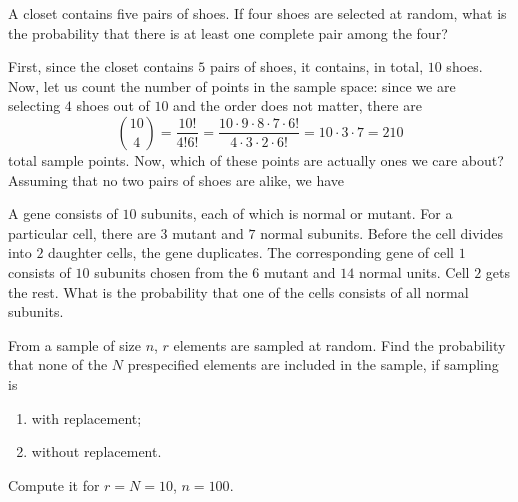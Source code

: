 \begin{problem}
  A closet contains five pairs of shoes. If four shoes are selected at
  random, what is the probability that there is at least one complete pair
  among the four?
\end{problem}
\begin{solution}
  First, since the closet contains \(5\) pairs of shoes, it contains, in
  total, \(10\) shoes. Now, let us count the number of points in the sample
  space: since we are selecting \(4\) shoes out of \(10\) and the order
  does not matter, there are
  \begin{equation}
    \label{eq:1-1}
    \binom{10}{4}=%
    \frac{10!}{4!6!}=%
    \frac{10\cdot 9\cdot 8\cdot 7\cdot 6!}{4\cdot 3\cdot 2\cdot 6!}=%
    10\cdot 3\cdot 7=%
    210
  \end{equation}
  total sample points. Now, which of these points are actually ones we care
  about? Assuming that no two pairs of shoes are alike, we have
\end{solution}
\newpage

\begin{problem}
  A gene consists of \(10\) subunits, each of which is normal or
  mutant. For a particular cell, there are \(3\) mutant and \(7\) normal
  subunits. Before the cell divides into \(2\) daughter cells, the gene
  duplicates. The corresponding gene of cell \(1\) consists of \(10\)
  subunits chosen from the \(6\) mutant and \(14\) normal units. Cell \(2\)
  gets the rest. What is the probability that one of the cells consists of
  all normal subunits.
\end{problem}
\begin{solution}

\end{solution}
\newpage

\begin{problem}
  From a sample of size \(n\), \(r\) elements are sampled at random. Find
  the probability that none of the \(N\) prespecified elements are included
  in the sample, if sampling is
  \begin{enumerate}[label=(\alph*)]
  \item with replacement;
  \item without replacement.
  \end{enumerate}
  Compute it for \(r=N=10\), \(n=100\).
\end{problem}
\begin{solution}

\end{solution}
\newpage

